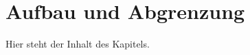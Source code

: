 \section{Aufbau und Abgrenzung}
\label{sec:01-03_scope-and-structure}

Hier steht der Inhalt des Kapitels.